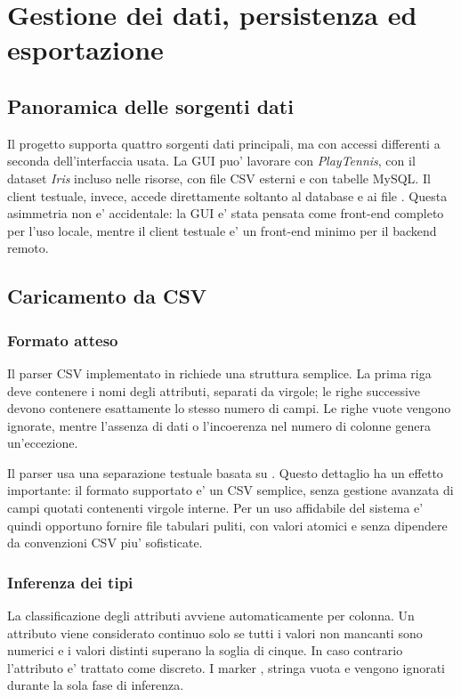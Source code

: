 \chapter{Gestione dei dati, persistenza ed esportazione}
\label{chap:dati-export}

\section{Panoramica delle sorgenti dati}

Il progetto supporta quattro sorgenti dati principali, ma con accessi differenti a
seconda dell'interfaccia usata. La GUI puo' lavorare con \emph{PlayTennis}, con il
dataset \emph{Iris} incluso nelle risorse, con file CSV esterni e con tabelle MySQL. Il
client testuale, invece, accede direttamente soltanto al database e ai file
. Questa asimmetria non e' accidentale: la GUI e' stata pensata come
front-end completo per l'uso locale, mentre il client testuale e' un front-end minimo per
il backend remoto.

\section{Caricamento da CSV}

\subsection{Formato atteso}

Il parser CSV implementato in  richiede una struttura semplice. La prima
riga deve contenere i nomi degli attributi, separati da virgole; le righe successive
devono contenere esattamente lo stesso numero di campi. Le righe vuote vengono ignorate,
mentre l'assenza di dati o l'incoerenza nel numero di colonne genera un'eccezione.

Il parser usa una separazione testuale basata su . Questo dettaglio ha
un effetto importante: il formato supportato e' un CSV semplice, senza gestione avanzata
di campi quotati contenenti virgole interne. Per un uso affidabile del sistema e' quindi
opportuno fornire file tabulari puliti, con valori atomici e senza dipendere da
convenzioni CSV piu' sofisticate.

\subsection{Inferenza dei tipi}

La classificazione degli attributi avviene automaticamente per colonna. Un attributo
viene considerato continuo solo se tutti i valori non mancanti sono numerici e i valori
distinti superano la soglia di cinque. In caso contrario l'attributo e' trattato come
discreto. I marker , stringa vuota e  vengono ignorati durante la
sola fase di inferenza.

